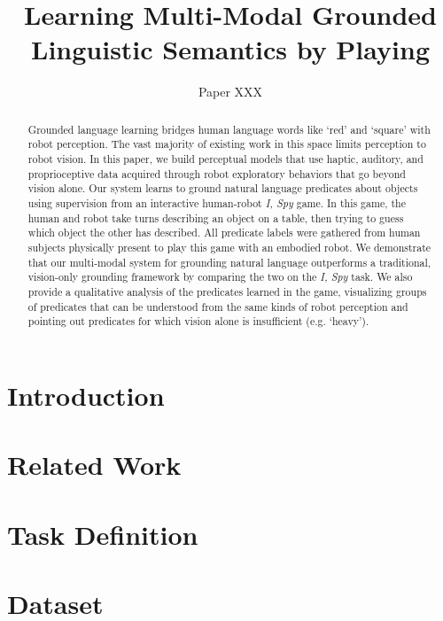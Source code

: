 \documentclass{article}
\title{Learning Multi-Modal Grounded Linguistic Semantics by Playing \ispy}
\author{Paper XXX}
\newcommand{\ispy}{\textit{I, Spy}\xspace}
\begin{document}
\maketitle

\begin{abstract}
Grounded language learning bridges human language words like `red' and `square' with robot perception.
The vast majority of existing work in this space limits perception to robot vision.
In this paper, we build perceptual models that use haptic, auditory, and proprioceptive data acquired through robot exploratory behaviors that go beyond vision alone.
Our system learns to ground natural language predicates about objects using supervision from an interactive human-robot \ispy game.
In this game, the human and robot take turns describing an object on a table, then trying to guess which object the other has described.
All predicate labels were gathered from human subjects physically present to play this game with an embodied robot.
We demonstrate that our multi-modal system for grounding natural language outperforms a traditional, vision-only grounding framework by comparing the two on the \ispy task.
We also provide a qualitative analysis of the predicates learned in the game, visualizing groups of predicates that can be understood from the same kinds of robot perception and pointing out predicates for which vision alone is insufficient (e.g. `heavy').
\end{abstract}

\section{Introduction}
\label{sec:introduction}
	

\section{Related Work}
\label{sec:relatedwork}
	

\section{Task Definition}
\label{sec:taskdefinition}
	

\section{Dataset}
\label{sec:dataset}
	
\end{document}
